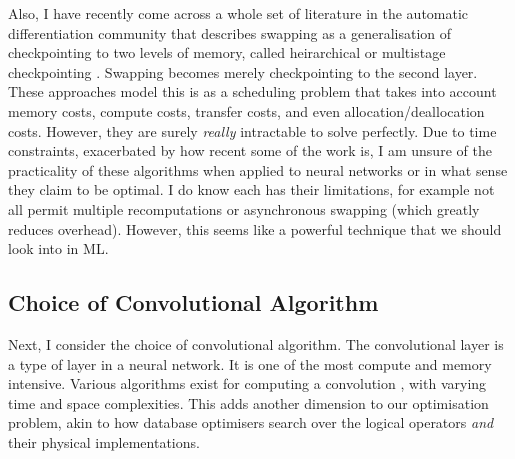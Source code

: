 Also, I have recently come across a whole set of literature in the automatic differentiation community that describes swapping as a generalisation of checkpointing to two levels of memory, called heirarchical or multistage checkpointing \cite{Aupy2016, Schanen2016, Kukreja2018, Aupy2019}.
Swapping becomes merely checkpointing to the second layer.
These approaches model this is as a scheduling problem that takes into account memory costs, compute costs, transfer costs, and even allocation/deallocation costs.
However, they are surely \textit{really} intractable to solve perfectly.
Due to time constraints, exacerbated by how recent some of the work is, I am unsure of the practicality of these algorithms when applied to neural networks or in what sense they claim to be optimal.
I do know each has their limitations, for example not all permit multiple recomputations or asynchronous swapping (which greatly reduces overhead).
However, this seems like a powerful technique that we should look into in ML.

\subsection{Choice of Convolutional Algorithm}
Next, I consider the choice of convolutional algorithm.
The convolutional layer is a type of layer in a neural network.
It is one of the most compute and memory intensive.
Various algorithms exist for computing a convolution \cite{Xu2018-convs, Li2016-convs}, with varying time and space complexities.
This adds another dimension to our optimisation problem, akin to how database optimisers search over the logical operators \textit{and} their physical implementations.

